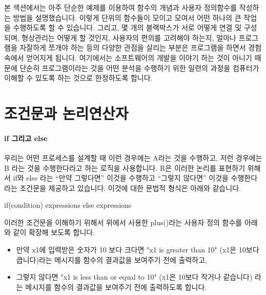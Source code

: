 

본 섹션에서는 아주 단순한 예제를 이용하여 함수의 개념과 사용자 정의함수를 작성하는 방법을 설명했습니다.  
이렇게 단위의 함수들이 모이고 모여서 어떤 하나의 큰 작업을 수행하도록 할 수 있습니다. 
그리고, 몇 개의 블랙박스가 서로 어떻게 연결 및  구성되며, 형상관리는 어떻게 할 것인지, 사용자의 편의를 고려해야 하는지, 얼마나 프로그램을 자잘하게 쪼개야 하는 등의 다양한 관점을 살리는 부분은 프로그램을 하면서 경험속에서 얻어지게 됩니다.
여기에서는 소프트웨어의 개발을 이야기 하는 것이 아니기 때문에 단순히 프로그램이라는 것을 어떤 분석을 수행하기 위한 일련의 과정을 컴퓨터가 이해할 수 있도록 하는 것으로 한정하도록 합니다.

\section{조건문과 논리연산자}

\paragraph{if 그리고 else} 
우리는 어떤 프로세스를 설계할 때 이런 경우에는 A라는 것을 수행하고, 저런 경우에는 B 라는 것을 수행한다라고 하는 로직을 사용합니다. 
R은 이러한 논리를 표현하기 위해서 if와 else 라는 ``만약 그렇다면'' 이것을 수행하고 ``그렇지 않다면'' 이것을 수행한다라는 조건문을 제공하고 있습니다.  
이것에 대한 문법적 형식은 아래와 같습니다. 

\begin{Schunk}
\begin{Soutput}
if(condition){
	expressions
}
else {
	expressions
}
\end{Soutput}
\end{Schunk}

이러한 조건문을 이해하기 위해서 위에서 사용한 plus()라는 사용자 정의 함수를 아래와 같이 확장해 보도록 합니다. 

\begin{itemize}
	\item 만약 x1에 입력받은 숫자가 10 보다 크다면 "x1 is greater than 10" (x1은 10보다 큽니다)라는 메시지를 함수의 결과값을 보여주기 전에 출력하고, 
	\item 그렇지 않다면 "x1 is less than or equal to 10" (x1은 10보다 작거나 같습니다) 라는 메시지를 함수의 결과값을 보여주기 전에 출력하도록 합니다.
\end{itemize}

